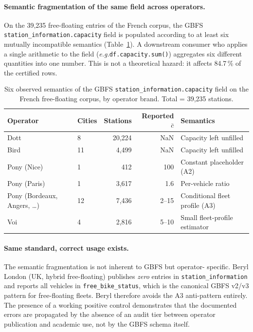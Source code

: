 \documentclass[11pt,a4paper]{article}
\newcommand{\eg}{\emph{e.g.}}
\begin{document}
\paragraph{Semantic fragmentation of the same field across operators.}
On the 39{,}235 free-floating entries of the French corpus, the
GBFS \texttt{station\_information.capacity} field is populated
according to at least six mutually incompatible semantics
(Table~\ref{tab:capacity-semantics}). A downstream consumer who
applies a single arithmetic to the field (\eg \texttt{df.capacity.sum()})
aggregates six different quantities into one number. This is not a
theoretical hazard: it affects 84.7\,\% of the certified rows.

\begin{table}[ht]
\centering
\caption{Six observed semantics of the GBFS
\texttt{station\_information.capacity} field on the French
free-floating corpus, by operator brand. Total = 39{,}235 stations.}
\label{tab:capacity-semantics}
\small
\begin{tabular}{@{}llrrl@{}}
\toprule
\textbf{Operator} & \textbf{Cities} & \textbf{Stations} & \textbf{Reported $\bar c$} & \textbf{Semantics}\\
\midrule
Dott         & 8  & 20{,}224 & NaN  & Capacity left unfilled \\
Bird         & 11 &  4{,}499 & NaN  & Capacity left unfilled \\
Pony (Nice)  & 1  &     412  & 100  & Constant placeholder (A2) \\
Pony (Paris) & 1  &  3{,}617 & 1.6  & Per-vehicle ratio \\
Pony (Bordeaux, Angers, \dots) & 12 &  7{,}436 & 2--15 & Conditional fleet profile (A3) \\
Voi          & 4  &  2{,}816 & 5--10 & Small fleet-profile estimator \\
\bottomrule
\end{tabular}
\end{table}

\paragraph{Same standard, correct usage exists.}
The semantic fragmentation is not inherent to GBFS but operator-
specific. Beryl London (UK, hybrid free-floating) publishes
\emph{zero} entries in \texttt{station\_information} and reports all
vehicles in \texttt{free\_bike\_status}, which is the canonical
GBFS v2/v3 pattern for free-floating fleets. Beryl therefore avoids
the A3 anti-pattern entirely. The presence of a working positive
control demonstrates that the documented errors are propagated by
the absence of an audit tier between operator publication and
academic use, not by the GBFS schema itself.
\end{document}
